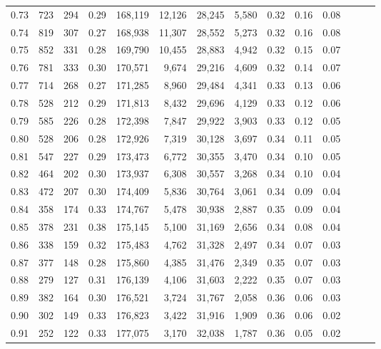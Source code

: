 \begin{tabular}{rrrrrrrrrrrrrr}
0.73 &    723 &  294 &  0.29 &  168,119 &   12,126 &  28,245 &   5,580 &  0.32 &  0.16 &      0.08 \\
0.74 &    819 &  307 &  0.27 &  168,938 &   11,307 &  28,552 &   5,273 &  0.32 &  0.16 &      0.08 \\
0.75 &    852 &  331 &  0.28 &  169,790 &   10,455 &  28,883 &   4,942 &  0.32 &  0.15 &      0.07 \\
0.76 &    781 &  333 &  0.30 &  170,571 &    9,674 &  29,216 &   4,609 &  0.32 &  0.14 &      0.07 \\
0.77 &    714 &  268 &  0.27 &  171,285 &    8,960 &  29,484 &   4,341 &  0.33 &  0.13 &      0.06 \\
0.78 &    528 &  212 &  0.29 &  171,813 &    8,432 &  29,696 &   4,129 &  0.33 &  0.12 &      0.06 \\
0.79 &    585 &  226 &  0.28 &  172,398 &    7,847 &  29,922 &   3,903 &  0.33 &  0.12 &      0.05 \\
0.80 &    528 &  206 &  0.28 &  172,926 &    7,319 &  30,128 &   3,697 &  0.34 &  0.11 &      0.05 \\
0.81 &    547 &  227 &  0.29 &  173,473 &    6,772 &  30,355 &   3,470 &  0.34 &  0.10 &      0.05 \\
0.82 &    464 &  202 &  0.30 &  173,937 &    6,308 &  30,557 &   3,268 &  0.34 &  0.10 &      0.04 \\
0.83 &    472 &  207 &  0.30 &  174,409 &    5,836 &  30,764 &   3,061 &  0.34 &  0.09 &      0.04 \\
0.84 &    358 &  174 &  0.33 &  174,767 &    5,478 &  30,938 &   2,887 &  0.35 &  0.09 &      0.04 \\
0.85 &    378 &  231 &  0.38 &  175,145 &    5,100 &  31,169 &   2,656 &  0.34 &  0.08 &      0.04 \\
0.86 &    338 &  159 &  0.32 &  175,483 &    4,762 &  31,328 &   2,497 &  0.34 &  0.07 &      0.03 \\
0.87 &    377 &  148 &  0.28 &  175,860 &    4,385 &  31,476 &   2,349 &  0.35 &  0.07 &      0.03 \\
0.88 &    279 &  127 &  0.31 &  176,139 &    4,106 &  31,603 &   2,222 &  0.35 &  0.07 &      0.03 \\
0.89 &    382 &  164 &  0.30 &  176,521 &    3,724 &  31,767 &   2,058 &  0.36 &  0.06 &      0.03 \\
0.90 &    302 &  149 &  0.33 &  176,823 &    3,422 &  31,916 &   1,909 &  0.36 &  0.06 &      0.02 \\
0.91 &    252 &  122 &  0.33 &  177,075 &    3,170 &  32,038 &   1,787 &  0.36 &  0.05 &      0.02 \\

\end{tabular}
